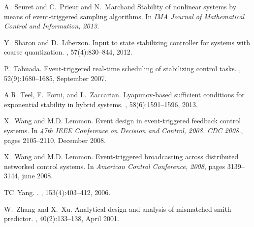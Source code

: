 \documentclass[twocolumn]{autart}
\begin{document}
\begin{thebibliography}{10}
A.~Seuret and C.~Prieur and N.~Marchand
\newblock Stability of nonlinear systems by means of event-triggered sampling algorithms.
\newblock In {\em IMA Journal of Mathematical Control and Information, 2013.} 

Y.~Sharon and D.~Liberzon.
\newblock Input to state stabilizing controller for systems with coarse
  quantization.
, 57(4):830--844, 2012.

P.~Tabuada.
\newblock Event-triggered real-time scheduling of stabilizing control tasks.
, 52(9):1680--1685,
  September 2007.

A.R. Teel, F.~Forni, and L.~Zaccarian.
\newblock Lyapunov-based sufficient conditions for exponential stability in
  hybrid systems.
, 58(6):1591--1596, 2013.

X.~Wang and M.D. Lemmon.
\newblock Event design in event-triggered feedback control systems.
\newblock In {\em 47th IEEE Conference on Decision and Control, 2008. CDC
  2008.}, pages 2105--2110, December 2008.

X.~Wang and M.D. Lemmon.
\newblock Event-triggered broadcasting across distributed networked control
  systems.
\newblock In {\em American Control Conference, 2008}, pages 3139--3144, june
  2008.

TC~Yang.
.
,
  153(4):403--412, 2006.

W.~Zhang and X.~Xu.
\newblock Analytical design and analysis of mismatched smith predictor.
, 40(2):133--138, April 2001.

\end{thebibliography}
\end{document}
